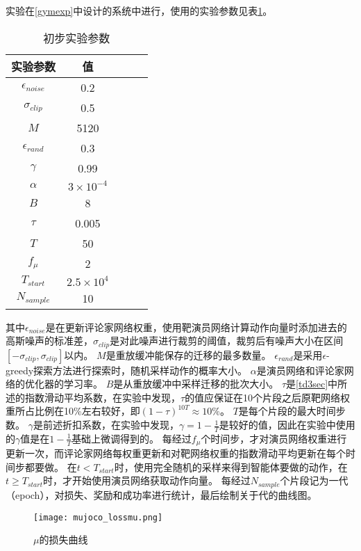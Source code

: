 实验在\ref{gymexp}中设计的系统中进行，使用的实验参数见表\ref{pretable}。
    \begin{table}[htbp]
        \caption{初步实验参数}
        \label{pretable}
    \vspace{0.5em}\centering\wuhao
    \begin{tabular}{ccccc}
    \toprule[1.5pt]
    实验参数 & 值\\
    \midrule[1pt]
        $\epsilon_{noise}$ & 0.2\\
        $\sigma_{clip}$ & 0.5\\
        $M$ & 5120\\
        $\epsilon_{rand}$ & 0.3\\
        $\gamma$ & 0.99\\
        $\alpha$ & $3\times 10^{-4}$\\
        $B$ & 8\\
        $\tau$ & 0.005\\
        $T$ & 50\\
        $f_\mu$ & 2\\
        $T_{start}$ & $2.5\times 10^4$\\
        $N_{sample}$ & 10 \\
    \bottomrule[1.5pt]
    \end{tabular}
    \end{table}
    其中$\epsilon_{noise}$是在更新评论家网络权重，使用靶演员网络计算动作向量时添加进去的高斯噪声的标准差，$\sigma_{clip}$是对此噪声进行裁剪的阈值，裁剪后有噪声大小在区间$[-\sigma_{clip},\sigma_{clip}]$以内。
    $M$是重放缓冲能保存的迁移的最多数量。
    $\epsilon_{rand}$是采用$\epsilon$-greedy探索方法进行探索时，随机采样动作的概率大小。
    $\alpha$是演员网络和评论家网络的优化器的学习率。
    $B$是从重放缓冲中采样迁移的批次大小。
    $\tau$是\ref{td3sec}中所述的指数滑动平均系数，在实验中发现，$\tau$的值应保证在10个片段之后原靶网络权重所占比例在10\%左右较好，即$(1-\tau)^{10T}\approx 10\%$。
    $T$是每个片段的最大时间步数。
    $\gamma$是前述折扣系数，在实验中发现，$\gamma=1-\frac{1}{T}$是较好的值，因此在实验中使用的$\gamma$值是在$1-\frac{1}{T}$基础上微调得到的。
    每经过$f_\mu$个时间步，才对演员网络权重进行更新一次，而评论家网络每权重更新和对靶网络权重的指数滑动平均更新在每个时间步都要做。
    在$t<T_{start}$时，使用完全随机的采样来得到智能体要做的动作，在$t\geq T_{start}$时，才开始使用演员网络获取动作向量。
    每经过$N_{sample}$个片段记为一代（epoch），对损失、奖励和成功率进行统计，最后绘制关于代的曲线图。

        \begin{figure}[htpb]
        \centering
        \texttt{[image: mujoco\_lossmu.png]}
        \caption{$\mu$的损失曲线}
            \label{mujocolossmu}
        \end{figure}

